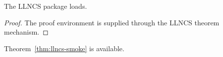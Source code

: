 \documentclass[runningheads]{llncs}
\begin{document}
\begin{theorem}\label{thm:llncs-smoke}The LLNCS package loads.\end{theorem}
\begin{proof}The proof environment is supplied through the LLNCS theorem mechanism.\end{proof}
Theorem~\cref{thm:llncs-smoke} is available.
\end{document}

